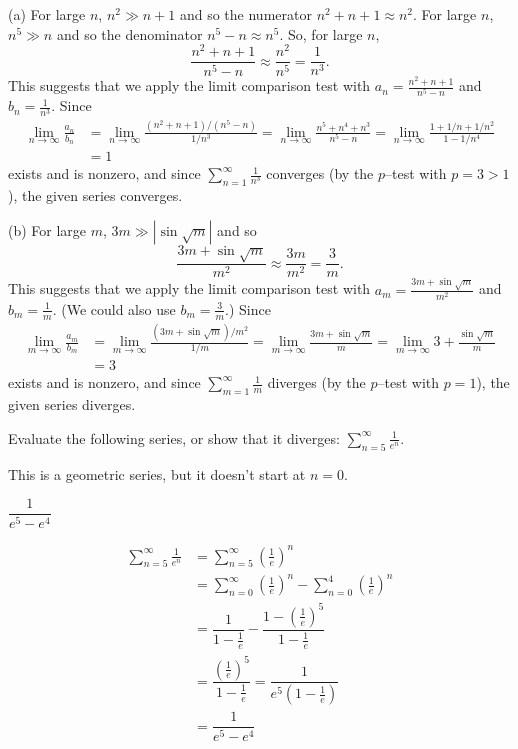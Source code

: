 \begin{solution}
(a) For large $n$, $n^2\gg n+1$ and so the numerator $n^2+n+1\approx n^2$.
For large $n$, $n^5\gg n$ and so the denominator $n^5-n\approx n^5$.
So, for large $n$, \[\frac{n^2+n+1}{n^5-n}\approx \frac{n^2}{n^5}
=\frac{1}{n^3}.\]
This suggests that we apply the limit
comparison test with $a_n=\frac{n^2+n+1}{n^5-n}$ and $b_n=\frac{1}{n^3}$.
Since
\begin{align*}
\lim_{n\rightarrow\infty} \frac{a_n}{b_n}
&=\lim_{n\rightarrow\infty} \frac{(n^2+n+1)/(n^5-n)}{1/n^3}
=\lim_{n\rightarrow\infty} \frac{n^5+n^4+n^3}{n^5-n}
=\lim_{n\rightarrow\infty} \frac{1+1/n+1/n^2}{1-1/n^4} \\
&=1
\end{align*}
exists and is nonzero, and since $\sum\limits_{n=1}^\infty\frac{1}{n^3}$ converges (by the $p$--test with $p=3>1$), the given series converges.

\noindent (b) For large $m$, $3m\gg |\sin\sqrt{m}|$ and
so \[\frac{3m+\sin\sqrt{m}}{m^2}\approx \frac{3m}{m^2}
=\frac{3}{m}.\]
This suggests that we apply the limit
comparison test with $a_m=\frac{3m+\sin\sqrt{m}}{m^2}$ and
$b_m=\frac{1}{m}$. (We could also use $b_m=\frac{3}{m}$.)
Since
\begin{align*}
\lim_{m\rightarrow\infty} \frac{a_m}{b_m}
&=\lim_{m\rightarrow\infty} \frac{(3m+\sin\sqrt{m})/m^2}{1/m}
=\lim_{m\rightarrow\infty} \frac{3m+\sin\sqrt{m}}{m}
=\lim_{m\rightarrow\infty} 3+\frac{\sin\sqrt{m}}{m} \\
&=3
\end{align*}
exists and is nonzero, and since $\sum\limits_{m=1}^\infty\frac{1}{m}$ diverges (by the $p$--test
with $p=1$), the given series diverges.
\end{solution}


\begin{question}
Evaluate the following series, or show that it diverges:
$\displaystyle\sum_{n=5}^\infty \frac{1}{e^n}$.
\end{question}

\begin{hint}
This is a geometric series, but it doesn't start at $n=0$.
\end{hint}

\begin{answer}
$\dfrac{1}{e^5-e^4}$
\end{answer}

\begin{solution}
\begin{align*}
\sum_{n=5}^\infty \frac{1}{e^n}&=\sum_{n=5}^\infty \left(\frac{1}{e}\right)^n\\
&=\sum_{n=0}^\infty \left(\frac{1}{e}\right)^n-\sum_{n=0}^4 \left(\frac{1}{e}\right)^n\\
&=\dfrac{1}{1-\frac{1}{e}}-\dfrac{1-\left(\frac{1}{e}\right)^{5}}{1-\frac{1}{e}}\\
&=\dfrac{\left(\frac{1}{e}\right)^5}{1-\frac{1}{e}}
=\dfrac{1}{e^5\left(1-\frac{1}{e}\right)}\\
&=\dfrac{1}{e^5-e^4}
\end{align*}
\end{solution}

